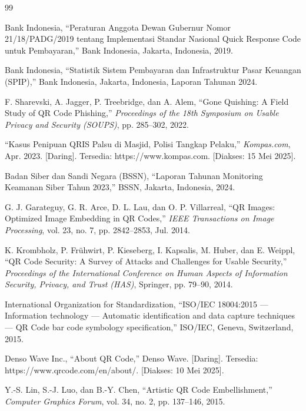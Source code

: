 \documentclass[conference]{IEEEtran}
\begin{document}
\begin{thebibliography}{99}

Bank Indonesia, ``Peraturan Anggota Dewan Gubernur Nomor 21/18/PADG/2019 tentang Implementasi Standar Nasional Quick Response Code untuk Pembayaran,'' Bank Indonesia, Jakarta, Indonesia, 2019.

Bank Indonesia, ``Statistik Sistem Pembayaran dan Infrastruktur Pasar Keuangan (SPIP),'' Bank Indonesia, Jakarta, Indonesia, Laporan Tahunan 2024.

F. Sharevski, A. Jagger, P. Treebridge, dan A. Alem, ``Gone Quishing: A Field Study of QR Code Phishing,'' \textit{Proceedings of the 18th Symposium on Usable Privacy and Security (SOUPS)}, pp. 285--302, 2022.

``Kasus Penipuan QRIS Palsu di Masjid, Polisi Tangkap Pelaku,'' \textit{Kompas.com}, Apr. 2023. [Daring]. Tersedia: https://www.kompas.com. [Diakses: 15 Mei 2025].

Badan Siber dan Sandi Negara (BSSN), ``Laporan Tahunan Monitoring Keamanan Siber Tahun 2023,'' BSSN, Jakarta, Indonesia, 2024.

G. J. Garateguy, G. R. Arce, D. L. Lau, dan O. P. Villarreal, ``QR Images: Optimized Image Embedding in QR Codes,'' \textit{IEEE Transactions on Image Processing}, vol. 23, no. 7, pp. 2842--2853, Jul. 2014.

K. Krombholz, P. Frühwirt, P. Kieseberg, I. Kapsalis, M. Huber, dan E. Weippl, ``QR Code Security: A Survey of Attacks and Challenges for Usable Security,'' \textit{Proceedings of the International Conference on Human Aspects of Information Security, Privacy, and Trust (HAS)}, Springer, pp. 79--90, 2014.

International Organization for Standardization, ``ISO/IEC 18004:2015 --- Information technology --- Automatic identification and data capture techniques --- QR Code bar code symbology specification,'' ISO/IEC, Geneva, Switzerland, 2015.

Denso Wave Inc., ``About QR Code,'' Denso Wave. [Daring]. Tersedia: https://www.qrcode.com/en/about/. [Diakses: 10 Mei 2025].

Y.-S. Lin, S.-J. Luo, dan B.-Y. Chen, ``Artistic QR Code Embellishment,'' \textit{Computer Graphics Forum}, vol. 34, no. 2, pp. 137--146, 2015.


\end{thebibliography}
\end{document}
